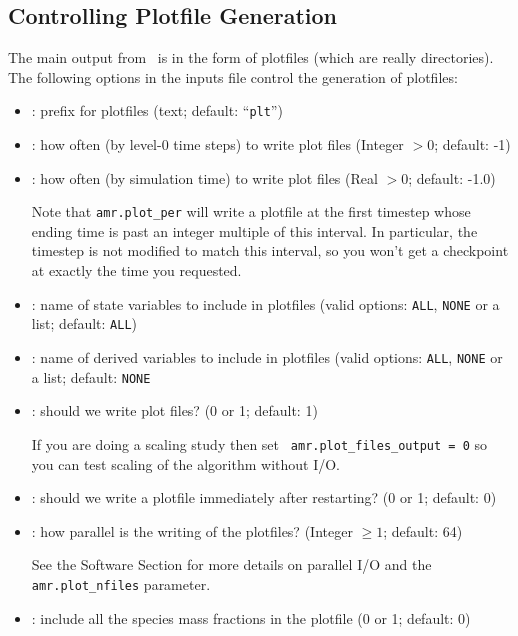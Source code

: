 \subsection{Controlling Plotfile Generation}
\label{sec:PlotFiles}
The main output from \castro\ is in the form of plotfiles (which are
really directories).  The following options in the inputs file control
the generation of plotfiles:
\begin{itemize}
\item {}: prefix for plotfiles (text; default:
  ``{\tt plt}'')

\item {}: how often (by level-0 time steps) to
  write plot files (Integer $> 0$; default: -1)

\item {}: how often (by simulation time) to write
  plot files (Real $> 0$; default: -1.0)

  Note that {\tt amr.plot\_per} will write a plotfile at the first
  timestep whose ending time is past an integer multiple of this interval.
  In particular, the timestep is not modified to match this interval, so
  you won't get a checkpoint at exactly the time you requested.

\item {}: name of state variables to include in
  plotfiles (valid options: {\tt ALL}, {\tt NONE} or a list; default:
  {\tt ALL})

\item {}: name of derived variables to
  include in plotfiles (valid options: {\tt ALL}, {\tt NONE} or a
  list; default: {\tt NONE}

\item {}: should we write plot files?
  (0 or 1; default: 1)

  If you are doing a scaling study then set {\tt
    amr.plot\_files\_output = 0} so you can test scaling of the
  algorithm without I/O.

\item {}: should we write a plotfile
  immediately after restarting?  (0 or 1; default: 0)
  
\item {}: how parallel is the writing of the
  plotfiles?  (Integer $\geq 1$; default: 64)

  See the Software Section for more details on parallel I/O and the
  {\tt amr.plot\_nfiles} parameter.

\item {}: include all the species mass
  fractions in the plotfile (0 or 1; default: 0)

\end{itemize}

